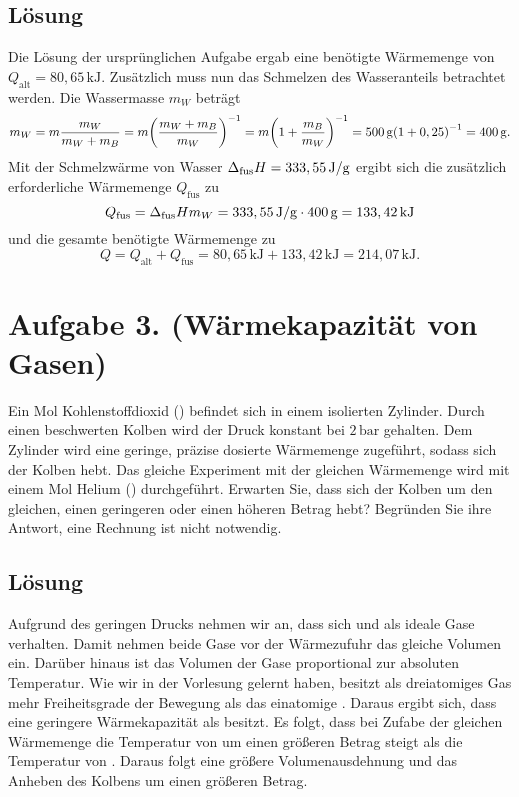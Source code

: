 \documentclass[german,12pt]{homework}
\DeclarePairedDelimiter{\enbrace}{(}{)}
\begin{document}
    \subsection*{Lösung} Die Lösung der ursprünglichen Aufgabe ergab eine
    benötigte Wärmemenge von \(Q_\text{alt} = 80,65\,\si{\kilo\joule}\).
    Zusätzlich muss nun das Schmelzen des Wasseranteils betrachtet werden. Die
    Wassermasse \(m_W\) beträgt
    \[m_W = m\frac{m_W}{m_W + m_B} = m\enbrace*{\frac{m_W + m_B}{m_W}}^{-1} =
    m\enbrace*{1 + \frac{m_B}{m_W}}^{-1} = 500\,\si{\g}\enbrace*{1 + 0,25}^{-1}
    = 400\,\si{\g}.\]
    Mit der Schmelzwärme von Wasser \(\Delta_\text{fus}H =
    333,55\,\si{\joule\per{\g}}\) ergibt sich die zusätzlich erforderliche
    Wärmemenge \(Q_\text{fus}\) zu
    \[Q_\text{fus} = \Delta_\text{fus}Hm_W = 333,55\,\si{\joule\per{\g}} \cdot
    400\,\si{\g} = 133,42\,\si{\kilo\joule}\]
    und die gesamte benötigte Wärmemenge zu
    \[Q = Q_\text{alt} + Q_\text{fus} = 80,65\,\si{\kilo\joule} +
    133,42\,\si{\kilo\joule} = 214,07\,\si{\kilo\joule}.\]

    \section*{Aufgabe 3. (Wärmekapazität von Gasen)}

    \begin{problem}
        Ein Mol Kohlenstoffdioxid () befindet sich in einem isolierten
        Zylinder. Durch einen beschwerten Kolben wird der Druck konstant bei
        \(2\,\si{\bar}\) gehalten. Dem Zylinder wird eine geringe, präzise
        dosierte Wärmemenge zugeführt, sodass sich der Kolben hebt. Das gleiche
        Experiment mit der gleichen Wärmemenge wird mit einem Mol Helium
        () durchgeführt. Erwarten Sie, dass sich der Kolben um den
        gleichen, einen geringeren oder einen höheren Betrag hebt? Begründen
        Sie ihre Antwort, eine Rechnung ist nicht notwendig.
    \end{problem}

    \subsection*{Lösung} Aufgrund des geringen Drucks nehmen wir an, dass sich
     und  als ideale Gase verhalten. Damit nehmen beide Gase vor
    der Wärmezufuhr das gleiche Volumen ein. Darüber hinaus ist das Volumen der
    Gase proportional zur absoluten Temperatur. Wie wir in der Vorlesung
    gelernt haben, besitzt  als dreiatomiges Gas mehr Freiheitsgrade
    der Bewegung als das einatomige . Daraus ergibt sich, dass 
    eine geringere Wärmekapazität als  besitzt. Es folgt, dass bei
    Zufabe der gleichen Wärmemenge die Temperatur von  um einen größeren
    Betrag steigt als die Temperatur von . Daraus folgt eine größere
    Volumenausdehnung und das Anheben des Kolbens um einen größeren Betrag.
\end{document}
